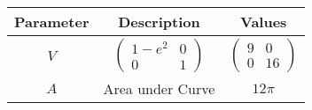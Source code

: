 \begin{tabular}[12pt]{|c|c|c|}
    \hline
    Parameter & Description & Values\\ 
    \hline
    $V$ & $\begin{pmatrix} 1-e^{2} & 0 \\ 0 & 1 \end{pmatrix}$ & $\begin{pmatrix} 9 & 0 \\ 0 & 16 \end{pmatrix}$ \\
    \hline
    $A$ & Area under Curve & $12\pi$ \\ 
    \hline
    \end{tabular}
